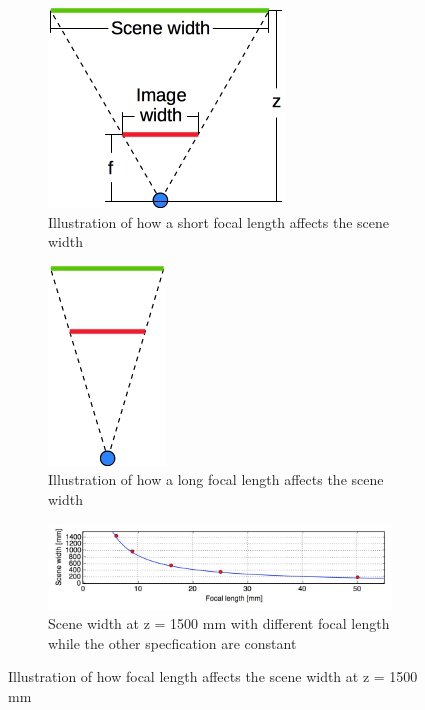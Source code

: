 \begin{figure}[ht!]
  \centering
  \begin{subfigure}[t]{0.45\textwidth}
    \centering\includegraphics[scale=0.75]{figures/scewiw.jpg}
    \caption{Illustration of how a short focal length affects the scene width\label{fig:scewiw}}
  \end{subfigure}\hspace{0.5cm}
  \begin{subfigure}[t]{0.45\textwidth}
    \centering\includegraphics[scale=0.75]{figures/scewiw2}
    \caption{Illustration of how a long focal length affects the scene width\label{fig:scewiw2}}
  \end{subfigure}
  \begin{subfigure}[t]{1\textwidth}
    \centering\includegraphics[width=1\textwidth]{figures/focalSceWid}
    \caption{Scene width at z = 1500 mm with different focal length while the other specfication are constant\label{fig:scewfocalplot}}
  \end{subfigure}
  \caption{Illustration of how focal length affects the scene width at z = 1500 mm \label{fig:scewiwall}}
\end{figure}
